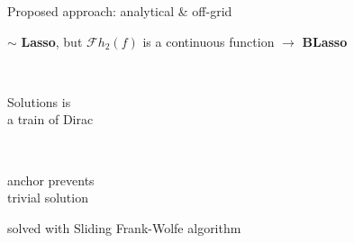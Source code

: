 \begin{frame}{Proposed approach: analytical \& off-grid \hfill\faJediOrder}
        \begin{center}
            \small
            $\sim$ \textbf{Lasso}, but $\mathcal{F}h_2 (f)$ is a continuous function $\to$ \textbf{BLasso}~\cite{bredies2020sparsity}

            \textcolor{mygreen}{ \qquad
            \cmark \, \parbox{8.5em}{Solutions is \\ a train of Dirac} \qquad
            \cmark \, \parbox{8em}{anchor prevents \\ trivial solution}}
        \end{center}

        \begin{center}
            solved with Sliding Frank-Wolfe algorithm \cite{denoyelle2019sliding}
        \end{center}

\end{frame}

